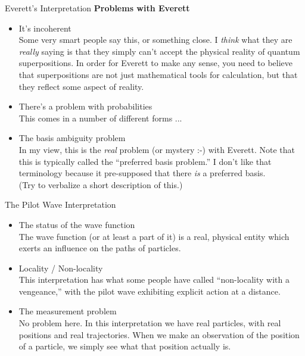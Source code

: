\documentclass[9pt,usenames,dvipsnames]{beamer}
\begin{document}
\begin{frame}[t]{Everett's Interpretation}
\vspace{0pt}
{\bf Problems with Everett}
\begin{itemize}
\vspace{6pt}
\item It's incoherent
    \vspace{6pt}\\
    Some very smart people say this, or something close. I {\it think}
    what they are {\it really} saying is that they simply can't accept
    the physical reality of quantum superpositions. In order for Everett
    to make any sense, you need to believe that superpositions are not
    just mathematical tools for calculation, but that they reflect some
    aspect of reality.
\vspace{6pt}
\item There's a problem with probabilities
    \vspace{6pt}\\
    This comes in a number of different forms ...
\vspace{6pt}
\item The basis ambiguity problem
    \vspace{6pt}\\
    In my view, this is the {\it real} problem (or mystery :-) with Everett.
    Note that
    this is typically called the ``preferred basis problem.'' I don't like
    that terminology because it pre-supposed that there {\it is} a preferred
    basis.
    \vspace{6pt}\\
    (Try to verbalize a short description of this.)
\end{itemize}
\end{frame}

\begin{frame}[t]{The Pilot Wave Interpretation}
\begin{itemize}
  \item The status of the wave function
  \vspace{6pt}\\
    The wave function (or at least a part of it) is a real, physical entity
    which exerts an influence on the paths of particles.
  \vspace{6pt}
  \item Locality / Non-locality
  \vspace{6pt}\\
    This interpretation has what some people have called 
    ``non-locality with a vengeance,'' with the pilot wave exhibiting explicit
    action at a distance.
  \vspace{6pt}
  \item The measurement problem
  \vspace{6pt}\\
    No problem here. In this interpretation we have real particles, with
    real positions and real trajectories. When we make an observation of
    the position of a particle, we simply see what that position actually is.
\end{itemize}
\end{frame}
\end{document}
